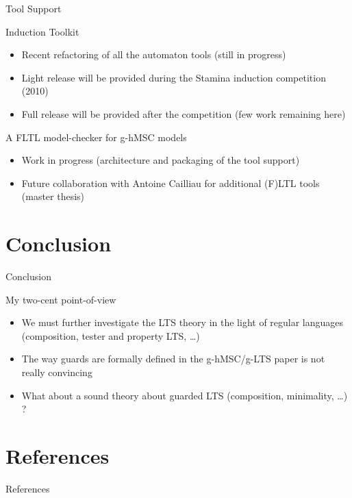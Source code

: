 \documentclass[11pt]{beamer}
\begin{document}
\begin{frame}{Tool Support}
	\begin{block}{Induction Toolkit}
		\begin{itemize}
			\item Recent refactoring of all the automaton tools (still in progress)
			\item Light release will be provided during the Stamina induction competition (2010)
			\item Full release will be provided after the competition (few work remaining here)
		\end{itemize}
	\end{block}
	\begin{block}{A FLTL model-checker for g-hMSC models}
		\begin{itemize}
			\item Work in progress (architecture and packaging of the tool support)
			\item Future collaboration with Antoine Cailliau for additional (F)LTL tools (master thesis)
		\end{itemize}
	\end{block}
\end{frame}

\section{Conclusion}
\begin{frame}{Conclusion}
	\begin{block}{My two-cent point-of-view}
		\begin{itemize}
			\item We must further investigate the LTS theory in the light of regular languages (composition, tester and property LTS, \ldots)
			\item The way guards are formally defined in the g-hMSC/g-LTS paper is not really convincing
			\item What about a sound theory about guarded LTS (composition, minimality, \ldots) ?
		\end{itemize}
	\end{block}
\end{frame}

\section{References}

\begin{frame}[allowframebreaks]{References}
	\tiny
	
	 
\end{frame}
\end{document}
